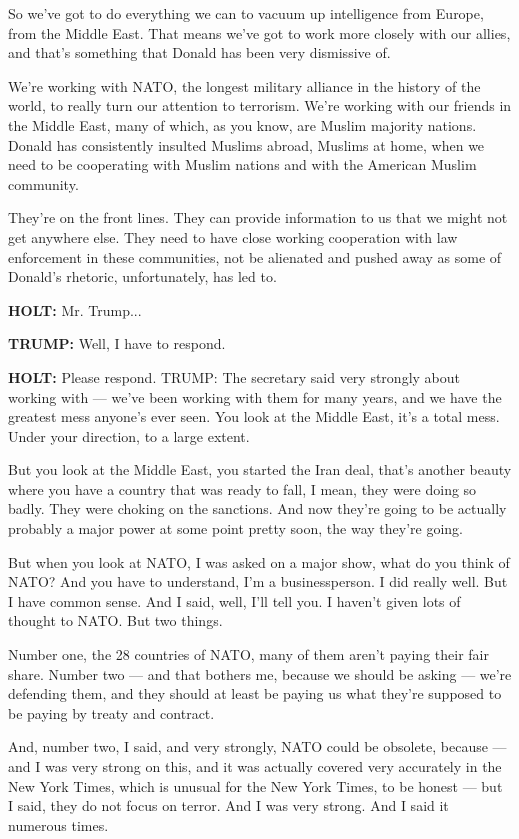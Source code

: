 So we've got to do everything we can to vacuum up intelligence from
Europe, from the Middle East. That means we've got to work more closely
with our allies, and that's something that Donald has been very
dismissive of.

We're working with NATO, the longest military alliance in the history of
the world, to really turn our attention to terrorism. We're working with
our friends in the Middle East, many of which, as you know, are Muslim
majority nations. Donald has consistently insulted Muslims abroad,
Muslims at home, when we need to be cooperating with Muslim nations and
with the American Muslim community.

They're on the front lines. They can provide information to us that we
might not get anywhere else. They need to have close working cooperation
with law enforcement in these communities, not be alienated and pushed
away as some of Donald's rhetoric, unfortunately, has led to.

\textbf{HOLT:} Mr. Trump...

\textbf{TRUMP:} Well, I have to respond.

\textbf{HOLT:} Please respond. TRUMP: The secretary said very strongly
about working with --- we've been working with them for many years, and
we have the greatest mess anyone's ever seen. You look at the Middle
East, it's a total mess. Under your direction, to a large extent.

But you look at the Middle East, you started the Iran deal, that's
another beauty where you have a country that was ready to fall, I mean,
they were doing so badly. They were choking on the sanctions. And now
they're going to be actually probably a major power at some point pretty
soon, the way they're going.

But when you look at NATO, I was asked on a major show, what do you
think of NATO? And you have to understand, I'm a businessperson. I did
really well. But I have common sense. And I said, well, I'll tell you. I
haven't given lots of thought to NATO. But two things.

Number one, the 28 countries of NATO, many of them aren't paying their
fair share. Number two --- and that bothers me, because we should be
asking --- we're defending them, and they should at least be paying us
what they're supposed to be paying by treaty and contract.

And, number two, I said, and very strongly, NATO could be obsolete,
because --- and I was very strong on this, and it was actually covered
very accurately in the New York Times, which is unusual for the New York
Times, to be honest --- but I said, they do not focus on terror. And I
was very strong. And I said it numerous times.

